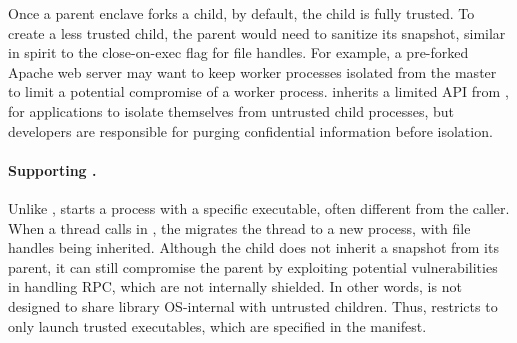 


Once a parent enclave forks a child, by default, the child is fully trusted.
To create a less trusted child, the parent would need to sanitize its snapshot,
similar in spirit to the close-on-exec flag for file handles.
For example, a pre-forked Apache web server may want to keep worker
processes isolated from the master %
to limit a potential compromise of a worker process. %
\graphenesgx{} inherits a limited API from \graphene{}, 
for applications to 
isolate themselves from untrusted child processes,
but developers are responsible for purging confidential information
before isolation.

\paragraph{Supporting .}

Unlike ,  
starts a process with a specific executable, often different from the caller.
When a thread calls  in \graphenesgx{},
the \libos{} migrates the thread to a new process,
with file handles being inherited.
Although the child does not inherit a snapshot from its parent,
it can still compromise the parent 
by exploiting potential vulnerabilities in handling RPC, 
which are not internally shielded.
In other words, \graphenesgx{} is not designed to share library OS-internal
with untrusted children.
Thus, \graphenesgx{} restricts  to only launch trusted executables, which are
specified in the manifest.


